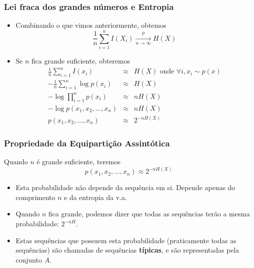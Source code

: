 \begin{frame}%
  \frametitle{Lei fraca dos grandes números e Entropia}
  \begin{itemize}
  \item Combinando o que vimos anteriormente, obtemos
        \begin{equation}
        \frac{1}{n} \sum_{i=1}^n I(X_i) \xrightarrow[n \rightarrow \infty]{p} H(X)
        \end{equation}
  \item Se $n$ fica grande suficiente, obteremos
        \begin{eqnarray}
        \frac{1}{n} \sum_{i=1}^n I(x_i) &\approx& H(X) \text{ onde } \forall i, x_i \sim p(x) \nonumber \\
        - \frac{1}{n} \sum_{i=1}^n \log p(x_i) &\approx& H(X) \nonumber \\
        - \log \prod_{i=1}^n p(x_i) &\approx& n H(X) \nonumber \\
        - \log p(x_1,x_2,\ldots,x_n) &\approx& n H(X) \nonumber \\
        p(x_1,x_2,\ldots,x_n) &\approx& 2^{-nH(X)}
        \end{eqnarray}
  \end{itemize}
\end{frame}

\begin{frame}%
  \frametitle{Propriedade da Equipartição Assintótica}
        Quando $n$ é grande suficiente, teremos
        \begin{equation}
        p(x_1,x_2,\ldots,x_n) \approx 2^{-nH(X)}
        \end{equation}
        
        \begin{itemize}
        \item Esta probabilidade não depende da sequência em si. Depende apenas do comprimento $n$
        e da entropia da v.a.
        \item Quando $n$ fica grande, podemos dizer que todas as sequências terão a mesma probabilidade: $2^{-nH}$.
        \item Estas sequências que possuem esta probabilidade (praticamente todas as sequências) são
        chamadas de sequências \textbf{típicas}, e são representadas pela conjunto $A$.
        \end{itemize}
\end{frame}

